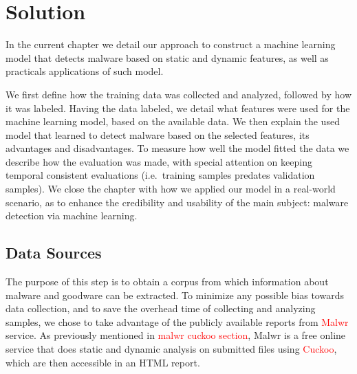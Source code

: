 
\chapter{Solution}
\label{chapter:implementation}

In the current chapter we detail our approach to construct a machine learning model that detects malware based on static and dynamic features, as well as practicals applications of such model.

We first define how the training data was collected and analyzed, followed by how it was labeled.
Having the data labeled, we detail what features were used for the machine learning model, based on the available data. We then explain the used model that learned to detect malware based on the selected features, its advantages and disadvantages. To measure how well the model fitted the data we describe how the evaluation was made, with special attention on keeping temporal consistent evaluations (i.e.\ training samples predates validation samples). We close the chapter with how we applied our model in a real-world scenario, as to enhance the credibility and usability of the main subject: malware detection via machine learning.

\section{Data Sources}
\label{section:data_sources}

The purpose of this step is to obtain a corpus from which information
about malware and goodware can be extracted.
To minimize any possible bias towards data collection, and to save the overhead time of collecting and analyzing samples, we chose to take advantage of the publicly available reports from \textcolor{red}{Malwr} service.
As previously mentioned in \textcolor{red}{malwr cuckoo section}, Malwr is a free online service that does static and dynamic analysis on submitted files using \textcolor{red}{Cuckoo}, which are then accessible in an HTML report.

